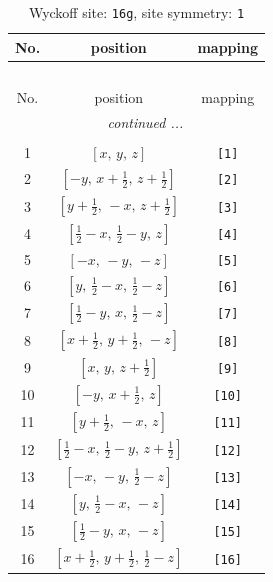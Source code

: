 \documentclass[fleqn,8pt]{jsarticle}
\begin{document}
\begin{longtable}{ccc}
\caption{Wyckoff site: {\tt 16g}, site symmetry: {\tt 1}}
 \\
 \hline \hline
No. & position & mapping \\ \hline \endfirsthead

\multicolumn{2}{l}{\tablename\ \thetable{}} \\
 \hline \hline
No. & position & mapping \\ \hline \endhead

 \hline \hline
\multicolumn{2}{r}{\footnotesize\it continued ...} \\ \endfoot

 \hline \hline
\multicolumn{2}{r}{} \\ \endlastfoot

1 & $\left[ x,\, y,\, z \right]$ & {\tt [1]} \\ \hline
2 & $\left[ - y,\, x + \frac{1}{2},\, z + \frac{1}{2} \right]$ & {\tt [2]} \\ \hline
3 & $\left[ y + \frac{1}{2},\, - x,\, z + \frac{1}{2} \right]$ & {\tt [3]} \\ \hline
4 & $\left[ \frac{1}{2} - x,\, \frac{1}{2} - y,\, z \right]$ & {\tt [4]} \\ \hline
5 & $\left[ - x,\, - y,\, - z \right]$ & {\tt [5]} \\ \hline
6 & $\left[ y,\, \frac{1}{2} - x,\, \frac{1}{2} - z \right]$ & {\tt [6]} \\ \hline
7 & $\left[ \frac{1}{2} - y,\, x,\, \frac{1}{2} - z \right]$ & {\tt [7]} \\ \hline
8 & $\left[ x + \frac{1}{2},\, y + \frac{1}{2},\, - z \right]$ & {\tt [8]} \\ \hline
9 & $\left[ x,\, y,\, z + \frac{1}{2} \right]$ & {\tt [9]} \\ \hline
10 & $\left[ - y,\, x + \frac{1}{2},\, z \right]$ & {\tt [10]} \\ \hline
11 & $\left[ y + \frac{1}{2},\, - x,\, z \right]$ & {\tt [11]} \\ \hline
12 & $\left[ \frac{1}{2} - x,\, \frac{1}{2} - y,\, z + \frac{1}{2} \right]$ & {\tt [12]} \\ \hline
13 & $\left[ - x,\, - y,\, \frac{1}{2} - z \right]$ & {\tt [13]} \\ \hline
14 & $\left[ y,\, \frac{1}{2} - x,\, - z \right]$ & {\tt [14]} \\ \hline
15 & $\left[ \frac{1}{2} - y,\, x,\, - z \right]$ & {\tt [15]} \\ \hline
16 & $\left[ x + \frac{1}{2},\, y + \frac{1}{2},\, \frac{1}{2} - z \right]$ & {\tt [16]} \\
\end{longtable}
\end{document}
